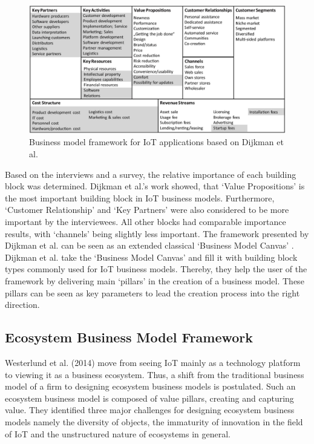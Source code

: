 		\begin{figure}[ht]
			\begin{center}
		    \includegraphics[scale=0.52]{Talk11/iot_canvas_dijkman.jpg}
		    \end{center}
		    \caption{Business model framework for IoT applications based on Dijkman et al. \cite{dijkman}}
		    \label{fig:bm_dijkman}
		\end{figure}

		Based on the interviews and a survey, the relative importance of each building block was determined. Dijkman et al.'s work showed, that `Value Propositions' is the most important building block in IoT business models. Furthermore, `Customer Relationship' and `Key Partners' were also considered to be more important by the interviewees. All other blocks had comparable importance results, with `channels' being slightly less important. The framework presented by Dijkman et al. can be seen as an extended classical `Business Model Canvas' \cite{bmc}. Dijkman et al. take the `Business Model Canvas' and fill it with building block types commonly used for IoT business models. Thereby, they help the user of the framework by delivering main `pillars' in the creation of a business model. These pillars can be seen as key parameters to lead the creation process into the right direction. 

	\subsection{Ecosystem Business Model Framework}
		Westerlund et al. (2014) \cite{westerlund} move from seeing IoT mainly as a technology platform to viewing it as a business ecosystem. Thus, a shift from the traditional business model of a firm to designing ecosystem business models is postulated. Such an ecosystem business model is composed of value pillars, creating and capturing value. They identified three major challenges for designing ecosystem business models namely the diversity of objects, the immaturity of innovation in the field of IoT and the unstructured nature of ecosystems in general.


